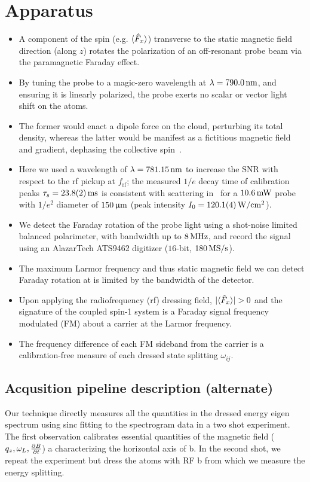 \documentclass[aps,prl,reprint,superscriptaddress,floatfix]{revtex4-1}
\begin{document}
\section{Apparatus}
\label{sec:apparatus}
\begin{itemize}
    \item A component of the spin (e.g. $\langle \hat{F}_x \rangle$) transverse to the static magnetic field direction (along $z$) rotates the polarization of an off-resonant probe beam via the paramagnetic Faraday effect.
    \item By tuning the probe to a magic-zero wavelength at $\lambda = \unit[790.0]{nm}$, and ensuring it is linearly polarized, the probe exerts no scalar or vector light shift on the atoms.
    \item The former would enact a dipole force on the cloud, perturbing its total density, whereas the latter would be manifest as a fictitious magnetic field and gradient, dephasing the collective spin~\cite{wood_measurement_2016}.
    \item Here we used a wavelength of $\lambda=\unit[781.15]{nm}$ to increase the SNR with respect to the rf pickup at $f_{\text{rf}}$; the measured $1/e$ decay time of calibration peaks $\tau_s = \unit[23.8(2)]{ms}$ is consistent with scattering in~\cite{jasperse_magic-wavelength_2017} for a $\unit[10.6]{mW}$ probe with $1/e^2$ diameter of $\unit[150]{\upmu m}$ (peak intensity $I_0 = \unit[120.1(4)]{W/cm^2}$).
    \item We detect the Faraday rotation of the probe light using a shot-noise limited balanced polarimeter, with bandwidth up to $\unit[8]{MHz}$, and record the signal using an AlazarTech \textsc{ATS9462} digitizer ($16$-bit, $\unit[180]{MS/s}$).
    \item The maximum Larmor frequency and thus static magnetic field we can detect Faraday rotation at is limited by the bandwidth of the detector.
    \item Upon applying the radiofrequency (rf) dressing field, $\vert \langle \hat{F}_x \rangle \vert  > 0$ and the signature of the coupled spin-1 system is a Faraday signal frequency modulated (FM) about a carrier at the Larmor frequency.
    \item The frequency difference of each FM sideband from the carrier is a calibration-free measure of each dressed state splitting $\omega_{ij}$.
\end{itemize}
  
\subsection{Acqusition pipeline description (alternate)}
Our technique directly measures all the quantities in the dressed energy eigen spectrum using sinc fitting to the spectrogram data in a two shot experiment. 
The first observation calibrates essential quantities of the magnetic field ($q_{z}, \omega_{L}, \frac{\partial B}{\partial t} $) a characterizing the horizontal axis of b. In the second shot, we repeat the experiment but dress the atoms with RF b from which we measure the energy splitting.    
\end{document}
